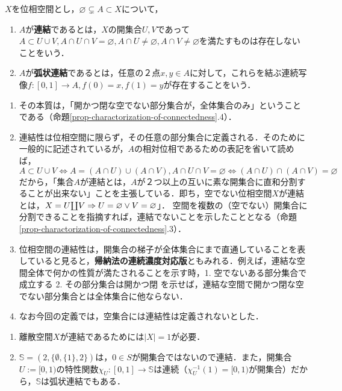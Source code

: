 \documentclass[uplatex, 12pt, dvipdfmx]{jsreport}
\begin{document}
\begin{definition}[connected]
    $X$を位相空間とし，$\varnothing\subsetneq A\subset X$について，
    \begin{enumerate}
        \item $A$が\textbf{連結}であるとは，$X$の開集合$U,V$であって$A\subset U\cup V,A\cap U\cap V=\varnothing, A\cap U\ne\varnothing, A\cap V\ne\varnothing$を満たすものは存在しないことをいう．
        \item $A$が\textbf{弧状連結}であるとは，任意の２点$x,y\in A$に対して，これらを結ぶ連続写像$f:[0,1]\to A, f(0)=x, f(1)=y$が存在することをいう．
    \end{enumerate}
\end{definition}
\begin{remark}[連結性とは何か]\mbox{}
    \begin{enumerate}
        \item その本質は，「開かつ閉な空でない部分集合が，全体集合のみ」ということである（命題\ref{prop-charactorization-of-connectedness}.4）．
        \item 連結性は位相空間に限らず，その任意の部分集合に定義される．そのために一般的に記述されているが，$A$の相対位相であるための表記を省いて読めば，$A\subset U\cup V\Leftrightarrow A=(A\cap U)\cup(A\cap V), A\cap U\cap V=\varnothing\Leftrightarrow (A\cap U)\cap(A\cap V)=\varnothing$だから，「集合$A$が連結とは，$A$が２つ以上の互いに素な開集合に直和分割することが出来ない」ことを主張している．即ち，空でない位相空間$X$が連結とは，$X=U\rotatebox[origin=c]{180}{$\prod$}V\Rightarrow U=\varnothing\lor V=\varnothing$」．
        空間を複数の（空でない）開集合に分割できることを指摘すれば，連結でないことを示したこととなる（命題\ref{prop-charactorization-of-connectedness}.3）．
        \item 位相空間の連結性は，開集合の梯子が全体集合にまで直通していることを表していると見ると，\textbf{帰納法の連続濃度対応版}ともみれる．例えば，連結な空間全体で何かの性質が満たされることを示す時，1. 空でないある部分集合で成立する 2. その部分集合は開かつ閉 を示せば，連結な空間で開かつ閉な空でない部分集合とは全体集合に他ならない．
        \item なお今回の定義では，空集合には連結性は定義されないとした．
    \end{enumerate}
\end{remark}

\begin{example}\mbox{}
    \begin{enumerate}
        \item 離散空間$X$が連結であるためには$|X|=1$が必要．
        \item $\mathbb{S}=(2,\{\emptyset,\{1\},2\})$は，$0\in S$が開集合ではないので連結．また，開集合$U:=[0,1)$の特性関数$\chi_U:[0,1]\to\mathbb{S}$は連続（$\chi_U^{-1}(1)=[0,1)$が開集合）だから，$\mathbb{S}$は弧状連結でもある．
    \end{enumerate}
\end{example}
\end{document}
